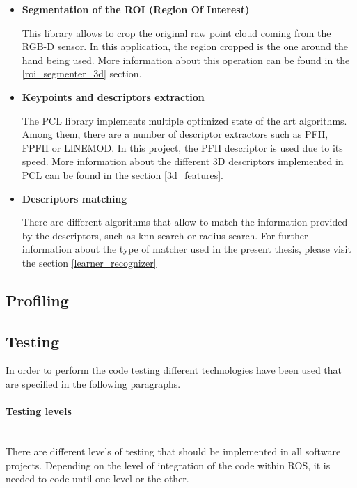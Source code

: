 		\begin{itemize}
			\item{\textbf{Segmentation of the ROI (Region Of Interest)\\ }}

			This library allows to crop the original raw point cloud coming from the RGB-D sensor. In this application, the region cropped is the one around the hand being used. More information about this operation can be found in the \ref{roi_segmenter_3d} section. 
			

			\item{\textbf{ Keypoints and descriptors extraction\\ }}

			 The PCL library implements multiple optimized state of the art algorithms. Among them, there are a number of descriptor extractors such as PFH, FPFH or LINEMOD. In this project, the PFH descriptor is used due to its speed. More information about the different 3D descriptors implemented in PCL can be found in the section \ref{3d_features}.


			\item {\textbf{Descriptors matching\\ }}

			There are different algorithms that allow to match the information provided by the descriptors, such as knn search or radius search. For further information about the type of matcher used in the present thesis, please visit the section \ref{learner_recognizer}
		\end{itemize}

	\subsection{Profiling}


	\subsection{Testing}
	\label{testing}
		In order to perform the code testing different technologies have been used that are specified in the following paragraphs. 
		\\


		\paragraph {Testing levels}\mbox{} \\

		There are different levels of testing that should be implemented in all software projects. Depending on the level of integration of the code within ROS, it is needed to code until one level or the other. 		\\

